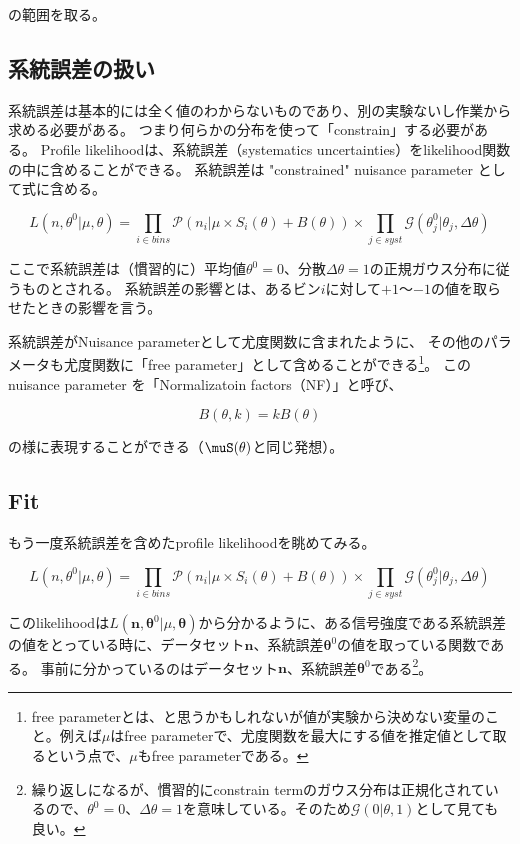 \documentclass[a4paper,uplatex]{jsreport}
\begin{document}
\begin{euation}
\begin{euation}
\begin{euation}
\begin{euation}
の範囲を取る。


\subsection{系統誤差の扱い}
系統誤差は基本的には全く値のわからないものであり、別の実験ないし作業から求める必要がある。
つまり何らかの分布を使って「constrain」する必要がある。
Profile likelihoodは、系統誤差（systematics uncertainties）をlikelihood関数の中に含めることができる。
系統誤差は "constrained" nuisance parameter として式に含める。

\begin{equation}
L(n,\theta^0|\mu,\theta) = \prod_{i\in bins} \mathcal{P}(n_i|\mu \times S_i(\theta)+B(\theta)) \times \prod_{j\in syst} \mathcal{G}(\theta_j^0|\theta_j,\Delta \theta)
\end{equation}

ここで系統誤差は（慣習的に）平均値$\theta^0=0$、分散$\Delta \theta=1$の正規ガウス分布に従うものとされる。
系統誤差の影響とは、あるビン$i$に対して$+1$〜$-1$の値を取らせたときの影響を言う。

系統誤差がNuisance parameterとして尤度関数に含まれたように、
その他のパラメータも尤度関数に「free parameter」として含めることができる\footnote{free parameterとは、と思うかもしれないが値が実験から決めない変量のこと。例えば$\mu$はfree parameterで、尤度関数を最大にする値を推定値として取るという点で、$\mu$もfree parameterである。}。
この nuisance parameter を「Normalizatoin factors（NF）」と呼び、

\begin{equation}
B(\theta,k)=kB(\theta)
\end{equation}

の様に表現することができる（$\muS(\theta)$と同じ発想）。

\subsection{Fit}

もう一度系統誤差を含めたprofile likelihoodを眺めてみる。

\begin{equation}
L(n,\theta^0|\mu,\theta) = \prod_{i\in bins} \mathcal{P}(n_i|\mu \times S_i(\theta)+B(\theta)) \times \prod_{j\in syst} \mathcal{G}(\theta_j^0|\theta_j,\Delta \theta)
\end{equation}

このlikelihoodは$L(\bm{n},\bm{\theta}^0|\mu,\bm{\theta})$から分かるように、ある信号強度である系統誤差の値をとっている時に、データセット$\bm{n}$、系統誤差$\bm{\theta}^0$の値を取っている関数である。
事前に分かっているのはデータセット$\bm{n}$、系統誤差$\bm{\theta}^0$である\footnote{繰り返しになるが、慣習的にconstrain termのガウス分布は正規化されているので、$\theta^0=0$、$\Delta \theta=1$を意味している。そのため$\mathcal{G}(0|\theta,1)$として見ても良い。}。


\end{euation}
\end{euation}
\end{euation}
\end{euation}
\end{document}
